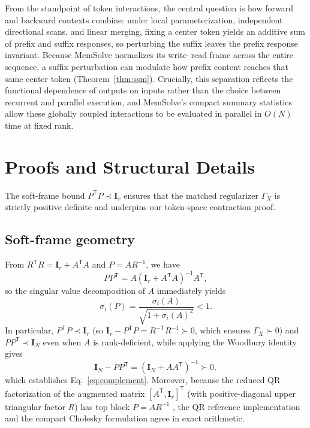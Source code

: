 \documentclass[10pt,twocolumn]{article}
\newcommand{\I}{\mathbf{I}}
\newcommand{\T}{\mathsf{T}}
\begin{document}
From the standpoint of token interactions, the central question is how
forward and backward contexts combine: under local parameterization,
independent directional scans, and linear merging, fixing a center token
yields an additive sum of prefix and suffix responses, so perturbing the
suffix leaves the prefix response invariant.
Because MemSolve normalizes its write--read frame across the entire sequence,
a suffix perturbation can modulate how prefix content reaches that same
center token (Theorem~\ref{thm:ssm}).
Crucially, this separation reflects the functional dependence of outputs on
inputs rather than the choice between recurrent and parallel execution, and
MemSolve's compact summary statistics allow these globally coupled
interactions to be evaluated in parallel in $O(N)$ time at fixed rank.

\section{Proofs and Structural Details}
\label{app:proofs}

The soft-frame bound $P^\T P\prec\I_r$ ensures that the matched regularizer
$\Gamma_X$ is strictly positive definite and underpins our token-space
contraction proof.

\subsection{Soft-frame geometry}
\label{app:frame}

From $R^\T R=\I_r+A^\T A$ and $P=AR^{-1}$, we have
\begin{equation}
 PP^\T=A(\I_r+A^\T A)^{-1}A^\T,
\end{equation}
so the singular value decomposition of $A$ immediately yields
\begin{equation}
 \sigma_i(P)=\frac{\sigma_i(A)}{\sqrt{1+\sigma_i(A)^2}}<1.
 \label{eq:soft-singular}
\end{equation}
In particular, $P^\T P\prec\I_r$ (so $\I_r-P^\T P=R^{-\T}R^{-1}\succ0$, which
ensures $\Gamma_X\succ0$) and $PP^\T\prec\I_N$ even when $A$ is
rank-deficient, while applying the Woodbury identity gives
\begin{equation}
 \I_N-PP^\T=(\I_N+AA^\T)^{-1}\succ0,
\end{equation}
which establishes Eq.~\eqref{eq:complement}.
Moreover, because the reduced QR factorization of the augmented matrix
$[A^\T,\I_r]^\T$ (with positive-diagonal upper triangular factor $R$) has top
block $P=AR^{-1}$ \cite{golub2013matrix}, the QR reference implementation and
the compact Cholesky formulation agree in exact arithmetic.
\end{document}
